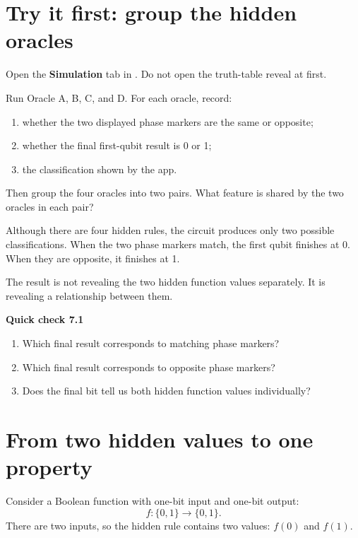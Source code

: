 \section{Try it first: group the hidden oracles}
\label{sec:ch07-try-first}

\begin{tryit}
Open the \textbf{Simulation} tab in . Do not open the truth-table reveal at first.

Run Oracle A, B, C, and D. For each oracle, record:
\begin{enumerate}
  \item whether the two displayed phase markers are the same or opposite;
  \item whether the final first-qubit result is 0 or 1;
  \item the classification shown by the app.
\end{enumerate}

Then group the four oracles into two pairs. What feature is shared by the two oracles in each pair?
\end{tryit}

Although there are four hidden rules, the circuit produces only two possible classifications. When the two phase markers match, the first qubit finishes at 0. When they are opposite, it finishes at 1.

The result is not revealing the two hidden function values separately. It is revealing a relationship between them.

\begin{checkpoint}
\textbf{Quick check 7.1}
\begin{enumerate}
  \item Which final result corresponds to matching phase markers?
  \item Which final result corresponds to opposite phase markers?
  \item Does the final bit tell us both hidden function values individually?
\end{enumerate}
\end{checkpoint}

\section{From two hidden values to one property}
\label{sec:ch07-one-property}

Consider a Boolean function with one-bit input and one-bit output:
\begin{equation}
f:\{0,1\}\longrightarrow\{0,1\}.
\label{eq:ch07-boolean-function}
\end{equation}
There are two inputs, so the hidden rule contains two values: $f(0)$ and $f(1)$.

